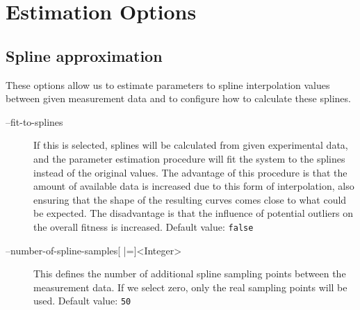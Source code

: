\section{Estimation Options}
\subsection{Spline approximation}
These options allow us to estimate parameters to spline interpolation values between given measurement data and to configure how to calculate these splines.
\begin{description}
\item[--fit-to-splines]
          If this is selected, splines will be calculated from given experimental
          data, and the parameter estimation procedure will fit the system
          to the splines instead of the original values. The advantage
          of this procedure is that the amount of available data is increased
          due to this form of interpolation, also ensuring that the shape
          of the resulting curves comes close to what could be expected.
          The disadvantage is that the influence of potential outliers
          on the overall fitness is increased.
          Default value: \texttt{false}
\item[--number-of-spline-samples{[} |={]}<Integer>]
          This defines the number of additional spline sampling points
          between the measurement data. If we select zero, only the real
          sampling points will be used.
          Default value: \texttt{50}
\end{description}

